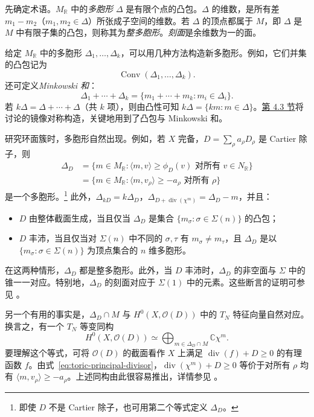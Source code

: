 先确定术语。$M_{\mathbb R}$ 中的\emph{多胞形} $\Delta$ 是有限个点的凸包。$\Delta$ 的维数，是所有差 $m_1-m_2$（$m_1,m_2\in\Delta$）所张成子空间的维数。若 $\Delta$ 的顶点都属于 $M$，即 $\Delta$ 是 $M$ 中有限子集的凸包，则称其为\emph{整多胞形}。\emph{刻面}是余维数为一的面。

给定 $M_{\mathbb R}$ 中的多胞形 $\Delta_1,\ldots,\Delta_k$，可以用几种方法构造新多胞形。例如，它们并集的凸包记为
\[
\operatorname{Conv}(\Delta_1,\ldots,\Delta_k).
\]
还可定义\emph{Minkowski 和}：
\[
\Delta_1+\cdots+\Delta_k
=\{m_1+\cdots+m_k:m_i\in\Delta_i\}.
\]
若 $k\Delta=\Delta+\cdots+\Delta$（共 $k$ 项），则由凸性可知 $k\Delta=\{km:m\in\Delta\}$。\hyperref[sec:toric-complete-intersections]{第 4.3 节}将讨论的镜像对称构造，关键地用到了凸包与 Minkowski 和。

研究环面簇时，多胞形自然出现。例如，若 $X$ 完备，$D=\sum_\rho a_\rho D_\rho$ 是 Cartier 除子，则
\begin{equation}\label{eq:divisor-polytope}
\begin{aligned}
\Delta_D
&=\{m\in M_{\mathbb R}:\langle m,v\rangle\geq\phi_D(v)
\text{ 对所有 }v\in N_{\mathbb R}\}\\
&=\{m\in M_{\mathbb R}:\langle m,v_\rho\rangle\geq-a_\rho
\text{ 对所有 }\rho\}
\end{aligned}
\end{equation}
是一个多胞形。\footnote{即使 $D$ 不是 Cartier 除子，也可用第二个等式定义 $\Delta_D$。}
此外，$\Delta_{kD}=k\Delta_D$，$\Delta_{D+\operatorname{div}(\chi^m)}=\Delta_D-m$，并且：
\begin{itemize}
\item $D$ 由整体截面生成，当且仅当 $\Delta_D$ 是集合 $\{m_\sigma:\sigma\in\Sigma(n)\}$ 的凸包；
\item $D$ 丰沛，当且仅当对 $\Sigma(n)$ 中不同的 $\sigma,\tau$ 有 $m_\sigma\ne m_\tau$，且 $\Delta_D$ 是以 $\{m_\sigma:\sigma\in\Sigma(n)\}$ 为顶点集合的 $n$ 维多胞形。
\end{itemize}
在这两种情形，$\Delta_D$ 都是整多胞形。此外，当 $D$ 丰沛时，$\Delta_D$ 的非空面与 $\Sigma$ 中的锥一一对应。特别地，$\Delta_D$ 的刻面对应于 $\Sigma(1)$ 中的元素。这些断言的证明可参见 。

另一个有用的事实是，$\Delta_D\cap M$ 与 $H^0(X,\mathcal O(D))$ 中的 $T_N$ 特征向量自然对应。换言之，有一个 $T_N$ 等变同构
\begin{equation}\label{eq:toric-sections}
H^0(X,\mathcal O(D))\simeq
\bigoplus_{m\in\Delta_D\cap M}\mathbb C\chi^m .
\end{equation}
要理解这个等式，可将 $\mathcal O(D)$ 的截面看作 $X$ 上满足 $\operatorname{div}(f)+D\geq0$ 的有理函数 $f$。由式~\eqref{eq:toric-principal-divisor}，$\operatorname{div}(\chi^m)+D\geq0$ 等价于对所有 $\rho$ 均有 $\langle m,v_\rho\rangle\geq-a_\rho$。上述同构由此很容易推出，详情参见 。

